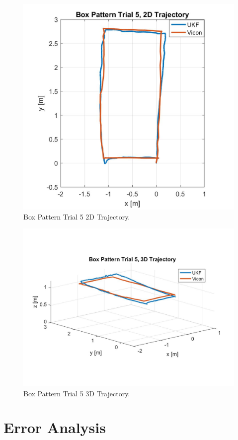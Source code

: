 \begin{figure}[p]
  \centering
    \includegraphics[height=0.6\textwidth]{box5_2d}
  \caption[Box Pattern Trial 5 2D Trajectory]{Box Pattern Trial 5 2D Trajectory.}
  \label{fig:box5_2d}
\end{figure}
\begin{figure}[p]
  \centering
    \includegraphics[height=0.7\textwidth]{box5_3d}
  \caption[Box Pattern Trial 5 3D Trajectory]{Box Pattern Trial 5 3D Trajectory.}
  \label{fig:box5_3d}
\end{figure}
\clearpage

\section{Error Analysis}

